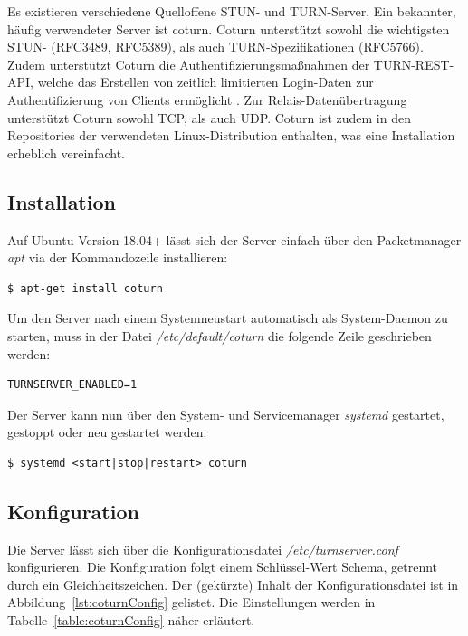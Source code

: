 Es existieren verschiedene Quelloffene \acs{STUN}- und \acs{TURN}-Server. Ein bekannter, häufig verwendeter Server ist \glqq{}coturn\grqq{}. Coturn unterstützt sowohl die wichtigsten \acs{STUN}- (RFC3489, RFC5389), als auch \acs{TURN}-Spezifikationen (RFC5766). Zudem unterstützt Coturn die Authentifizierungsmaßnahmen der \glqq{}TURN-REST-API\grqq{}, welche das Erstellen von zeitlich limitierten Login-Daten zur Authentifizierung von Clients ermöglicht \cite{turnrestRFC}. Zur Relais-Datenübertragung unterstützt Coturn sowohl \acs{TCP}, als auch \acs{UDP}. Coturn ist zudem in den Repositories der verwendeten Linux-Distribution enthalten, was eine Installation erheblich vereinfacht.\par

\subsection{Installation}
Auf Ubuntu Version 18.04+ lässt sich der Server einfach über den Packetmanager \textit{apt} via der Kommandozeile installieren:
\lstset{style=STYLE_COMMAND_LINE_ARGUMENT_SINGLE_LINE}
\begin{lstlisting}[belowskip=-0.8 \baselineskip]
$ apt-get install coturn
\end{lstlisting}

Um den Server nach einem Systemneustart automatisch als System-Daemon zu starten, muss in der Datei \textit{/etc/default/coturn} die folgende Zeile geschrieben werden:
\lstset{style=STYLE_COMMAND_LINE_ARGUMENT_SINGLE_LINE}
\begin{lstlisting}[belowskip=-0.8 \baselineskip]
TURNSERVER_ENABLED=1
\end{lstlisting}

Der Server kann nun über den System- und Servicemanager \textit{systemd} gestartet, gestoppt oder neu gestartet werden:
\lstset{style=STYLE_COMMAND_LINE_ARGUMENT_SINGLE_LINE}
\begin{lstlisting}[belowskip=-0.8 \baselineskip]
$ systemd <start|stop|restart> coturn
\end{lstlisting}

\subsection{Konfiguration}
Die Server lässt sich über die Konfigurationsdatei \textit{/etc/turnserver.conf} konfigurieren. Die Konfiguration folgt einem Schlüssel-Wert Schema, getrennt durch ein Gleichheitszeichen. Der (gekürzte) Inhalt der Konfigurationsdatei ist in Abbildung~\ref{lst:coturnConfig} gelistet. Die Einstellungen werden in Tabelle~\ref{table:coturnConfig} näher erläutert.

